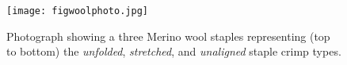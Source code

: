 %

\begin{figure}[!h]
  \centering
  \texttt{[image: figwoolphoto.jpg]}
  \caption{Photograph showing a three Merino wool staples representing (top to bottom) the {\em unfolded}, {\em stretched}, and {\em unaligned} staple crimp types. }
  \label{fig:woolphoto}
\end{figure}

%

